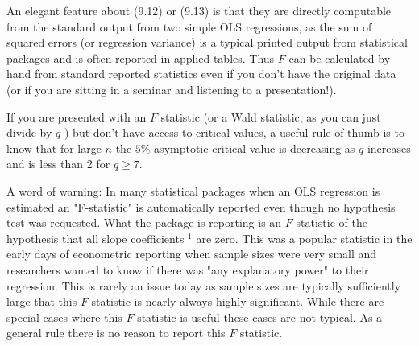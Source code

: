 \documentclass[10pt]{article}
\begin{document}
An elegant feature about (9.12) or (9.13) is that they are directly computable from the standard output from two simple OLS regressions, as the sum of squared errors (or regression variance) is a typical printed output from statistical packages and is often reported in applied tables. Thus $F$ can be calculated by hand from standard reported statistics even if you don't have the original data (or if you are sitting in a seminar and listening to a presentation!).

If you are presented with an $F$ statistic (or a Wald statistic, as you can just divide by $q$ ) but don't have access to critical values, a useful rule of thumb is to know that for large $n$ the $5 \%$ asymptotic critical value is decreasing as $q$ increases and is less than 2 for $q \geq 7$.

A word of warning: In many statistical packages when an OLS regression is estimated an "F-statistic" is automatically reported even though no hypothesis test was requested. What the package is reporting is an $F$ statistic of the hypothesis that all slope coefficients ${ }^{1}$ are zero. This was a popular statistic in the early days of econometric reporting when sample sizes were very small and researchers wanted to know if there was "any explanatory power" to their regression. This is rarely an issue today as sample sizes are typically sufficiently large that this $F$ statistic is nearly always highly significant. While there are special cases where this $F$ statistic is useful these cases are not typical. As a general rule there is no reason to report this $F$ statistic.
\end{document}
